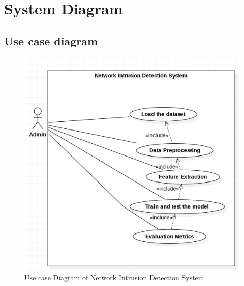\section{System Diagram}
\vspace{-18pt}
\subsection{Use case diagram}
\begin{figure}[h]
\begin{center}
	\includegraphics[width=5in]{images/use.jpg} 
	\caption{Use case Diagram of Network Intrusion Detection System} %
	\label{Use case Diagram of Network Intrusion Detection System} %
\end{center}
\end{figure}
\newpage
